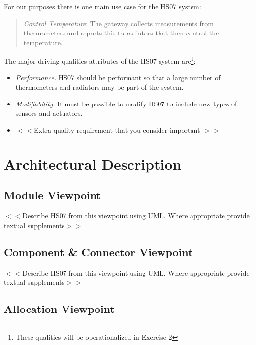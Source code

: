 \documentclass[a4paper,10pt]{article}
\begin{document}
For our purposes there is one main use case for the HS07 system:
\begin{quote}
  \emph{Control Temperature}: The gateway collects measurements from
  thermometers and reports this to radiators that then control the
  temperature.
\end{quote}

The major driving qualities attributes of the HS07 system
are\footnote{These qualities will be operationalized in Exercise 2}:

\begin{itemize}
\item \emph{Performance.} HS07 should be performant so that a large
  number of thermometers and radiators may be part of the system.
\item \emph{Modifiability.} It must be possible to modify HS07 to
  include new types of sensors and actuators.
  \item $<<$Extra quality requirement that you consider important $>>$
\end{itemize}


\section{Architectural Description}


\subsection{Module Viewpoint}

$<<$Describe HS07 from this viewpoint using UML. Where appropriate
provide textual supplements$>>$

\subsection{Component \& Connector Viewpoint}

$<<$Describe HS07 from this viewpoint using UML. Where appropriate
provide textual supplements$>>$

\subsection{Allocation Viewpoint}
\end{document}
